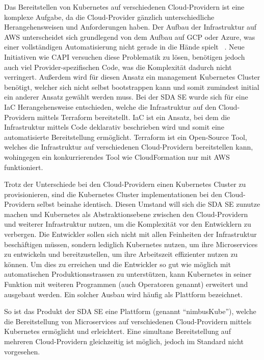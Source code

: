 Das Bereitstellen von Kubernetes auf verschiedenen Cloud-Providern ist eine komplexe Aufgabe, da die Cloud-Provider gänzlich unterschiedliche Herangehensweisen und Anforderungen haben.
Der Aufbau der Infrastruktur auf AWS unterscheidet sich grundlegend von dem Aufbau auf GCP oder Azure, was einer vollständigen Automatisierung nicht gerade in die Hände spielt ~\cite[p.~450]{khot2020comparative}.
Neue Initiativen wie \ac{CAPI} versuchen diese Problematik zu lösen, benötigen jedoch auch viel Provider-spezifischen Code, was die Komplexität dadurch nicht verringert.
Außerdem wird für diesen Ansatz ein management Kubernetes Cluster benötigt, welcher sich nicht selbst bootstrappen kann und somit zumindest initial ein anderer Ansatz gewählt werden muss.
Bei der SDA SE wurde sich für eine \ac{IaC} Herangehensweise entschieden, welche die Infrastruktur auf den Cloud-Providern mittels Terraform bereitstellt.
IaC ist ein Ansatz, bei dem die Infrastruktur mittels Code deklarativ beschrieben wird und somit eine automatisierte Bereitstellung ermöglicht.
Terraform ist ein Open-Source Tool, welches die Infrastruktur auf verschiedenen Cloud-Providern bereitstellen kann, wohingegen ein konkurrierendes Tool wie CloudFormation nur mit AWS funktioniert.
\medskip

Trotz der Unterschiede bei den Cloud-Providern einen Kubernetes Cluster zu provisionieren, sind die Kubernetes Cluster implementationen bei den Cloud-Providern selbst beinahe identisch.
Diesen Umstand will sich die SDA SE zunutze machen und Kubernetes als Abstraktionsebene zwischen den Cloud-Providern und weiterer Infrastruktur nutzen, um die Komplexität vor den Entwicklern zu verbergen.
Die Entwickler sollen sich nicht mit allen Feinheiten der Infrastruktur beschäftigen müssen, sondern lediglich Kubernetes nutzen, um ihre Microservices zu entwickeln und bereitzustellen, um ihre Arbeitszeit effizienter nutzen zu können.
Um dies zu erreichen und die Entwickler so gut wie möglich mit automatischen Produktionsstrassen zu unterstützen, kann Kubernetes in seiner Funktion mit weiteren Programmen (auch Operatoren genannt) erweitert und ausgebaut werden.
Ein solcher Ausbau wird häufig als Plattform bezeichnet.
\medskip

So ist das Produkt der SDA SE eine Plattform (genannt \enquote{nimbusKube}), welche die Bereitstellung von Microservices auf verschiedenen Cloud-Providern mittels Kubernetes ermöglicht und erleichtert.
Eine simultane Bereitstellung auf mehreren Cloud-Providern gleichzeitig ist möglich, jedoch im Standard nicht vorgesehen.

